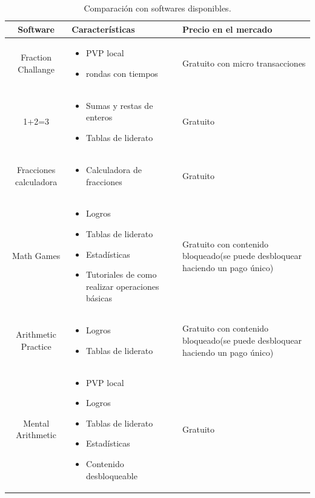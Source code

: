 \documentclass{article}
\begin{document}
\begin{table}[H]
\centering
\begin{tabular}{|c|M{6cm}|M{5cm}|}
\hline
Software & Características & Precio en el mercado \\ \hline

Fraction Challange & 
\begin{itemize}
	\item PVP local
	\item rondas con tiempos
\end{itemize} & 
Gratuito con micro transacciones \\ \hline


1+2=3 & 
\begin{itemize}
	\item Sumas y restas de enteros
	\item Tablas de liderato 
\end{itemize}& 
Gratuito \\ \hline


Fracciones calculadora & 
\begin{itemize}
	\item Calculadora de fracciones
\end{itemize}& 
Gratuito \\ \hline


Math Games & 
\begin{itemize}
	\item Logros
	\item Tablas de liderato
	\item Estadísticas
	\item Tutoriales de como realizar operaciones básicas
\end{itemize} & 
Gratuito con contenido bloqueado(se puede desbloquear haciendo un pago único) \\ \hline

Arithmetic Practice & 
\begin{itemize}
	\item Logros
	\item Tablas de liderato
\end{itemize} & 
Gratuito con contenido bloqueado(se puede desbloquear haciendo un pago único) \\ \hline


Mental Arithmetic  & 
\begin{itemize}
	\item PVP local
	\item Logros
	\item Tablas de liderato
	\item Estadísticas
	\item Contenido desbloqueable
\end{itemize} & 
Gratuito \\ \hline

\end{tabular}
\label{tab:software}
\caption{Comparación con softwares disponibles.}
\end{table}
\end{document}
